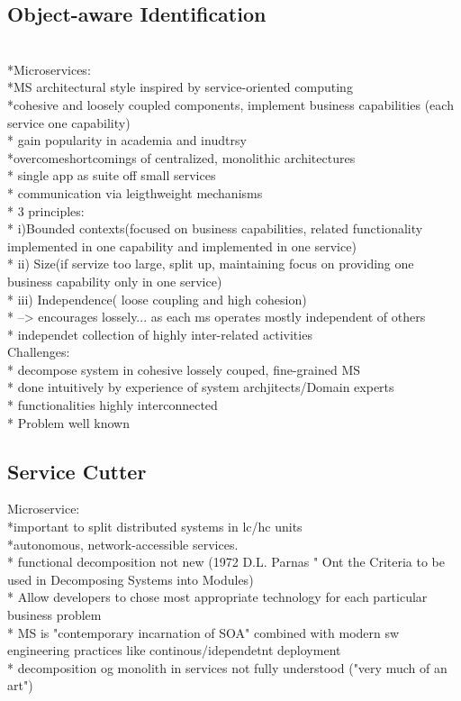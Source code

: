 \subsection{Object-aware Identification}
\cite{ObjectAwareAmiri} \\
*Microservices:\\
*MS architectural style inspired by service-oriented computing \\
*cohesive and loosely coupled components, implement business capabilities (each service one capability)\\
* gain popularity in academia and inudtrsy\\
*overcomeshortcomings of centralized, monolithic architectures\\
* single app as suite off small services\\
* communication via leigthweight  mechanisms\\
* 3 principles: \\
* i)Bounded contexts(focused on business capabilities, related functionality implemented in one capability and implemented in one service)\\
* ii)  Size(if servize too large, split up, maintaining focus on providing one business capability only in one service)\\
* iii) Independence( loose coupling and high cohesion)\\
* --> encourages lossely... as each ms operates mostly independent of others \\ 
* independet collection of highly inter-related activities \\

Challenges:\\
* decompose system in cohesive lossely couped, fine-grained MS \\
* done intuitively by experience of system archjitects/Domain experts\\
* functionalities highly interconnected\\
* Problem well known \\

\subsection{Service Cutter}
\cite{ServiceCutter}

Microservice:\\
*important to split distributed systems in lc/hc units\\
*autonomous, network-accessible services.\\
* functional decomposition not new (1972 D.L. Parnas " Ont the Criteria to be used in Decomposing Systems into Modules)\\
* Allow developers to chose most appropriate technology for each particular business problem\\
* MS is "contemporary incarnation of SOA" combined with modern sw engineering practices like continous/idependetnt deployment\\
* decomposition og monolith in services not fully understood ("very much of an art")\\


